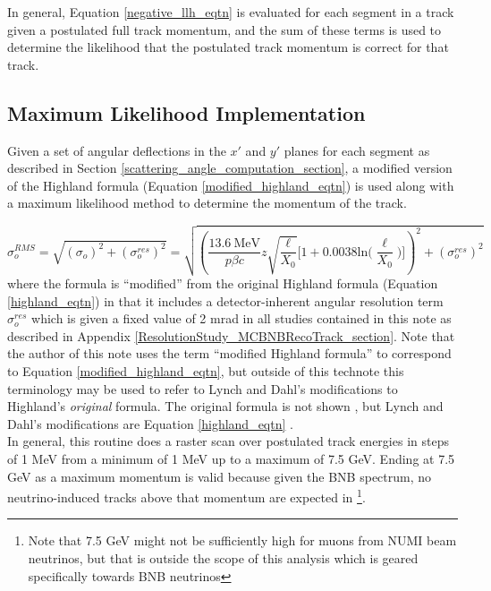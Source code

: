 In general, Equation \ref{negative_llh_eqtn} is evaluated for each segment in a track given a postulated full track momentum, and the sum of these terms is used to determine the likelihood that the postulated track momentum is correct for that track.

\subsection{Maximum Likelihood Implementation}\label{maximum_likelihood_section}

Given a set of angular deflections in the $x'$ and $y'$ planes for each segment as described in Section \ref{scattering_angle_computation_section}, a modified version of the Highland formula (Equation \ref{modified_highland_eqtn}) is used along with a maximum likelihood method to determine the momentum of the track. 

\begin{equation}\label{modified_highland_eqtn}
\sigma_{o}^{RMS} = \sqrt{ (\sigma_o)^2 + (\sigma_o^{res})^2} = \sqrt{ (\frac{13.6\  \text{MeV}}{p\beta c}z\sqrt{\frac{\ell}{X_0}}\Big[1+0.0038\text{ln}\Big(\frac{\ell}{X_0}\Big)\Big])^2 + (\sigma_o^{res})^2 }
\end{equation}
where the formula is ``modified'' from the original Highland formula (Equation \ref{highland_eqtn}) in that it includes a detector-inherent angular resolution term $\sigma_o^{res}$ which is given a fixed value of 2 mrad in all studies contained in this note as described in Appendix \ref{ResolutionStudy_MCBNBRecoTrack_section}\cite{leonidas2}. Note that the author of this note uses the term ``modified Highland formula'' to correspond to Equation \ref{modified_highland_eqtn}, but outside of this technote this terminology may be used to refer to Lynch and Dahl's modifications to Highland's \textit{original} formula. The original formula is not shown \cite{highland}, but Lynch and Dahl's modifications are Equation \ref{highland_eqtn} \cite{highland-lynch-dahl}.\\

In general, this routine does a raster scan over postulated track energies in steps of 1 MeV from a minimum of 1 MeV up to a maximum of 7.5 GeV. Ending at 7.5 GeV as a maximum momentum is valid because given the BNB spectrum, no neutrino-induced tracks above that momentum are expected in {\ub}\footnote{Note that 7.5 GeV might not be sufficiently high for muons from NUMI beam neutrinos, but that is outside the scope of this analysis which is geared specifically towards BNB neutrinos}.\\

